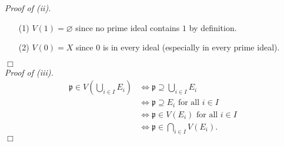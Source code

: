 \documentclass{article}
\begin{document}
\emph{Proof of (ii).}
\begin{enumerate}
\item[(1)]
  \emph{$V(1) = \varnothing$} since no prime ideal contains $1$ by definition.

\item[(2)]
  \emph{$V(0) = X$} since $0$ is in every ideal (especially in every prime ideal).
\end{enumerate}
$\Box$ \\



\emph{Proof of (iii).}
\begin{align*}
  \mathfrak{p} \in V\left( \bigcup_{i \in I}E_i \right)
  &\Longleftrightarrow \mathfrak{p} \supseteq \bigcup_{i \in I}E_i \\
  &\Longleftrightarrow \mathfrak{p} \supseteq E_i \text{ for all } i \in I \\
  &\Longleftrightarrow \mathfrak{p} \in V(E_i) \text{ for all } i \in I \\
  &\Longleftrightarrow \mathfrak{p} \in \bigcap_{i \in I} V(E_i).
\end{align*}
$\Box$ \\
\end{document}
